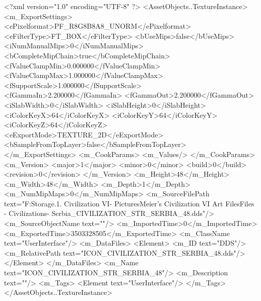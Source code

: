 <?xml version="1.0" encoding="UTF-8" ?>
<AssetObjects..TextureInstance>
	<m_ExportSettings>
		<ePixelformat>PF_R8G8B8A8_UNORM</ePixelformat>
		<eFilterType>FT_BOX</eFilterType>
		<bUseMips>false</bUseMips>
		<iNumManualMips>0</iNumManualMips>
		<bCompleteMipChain>true</bCompleteMipChain>
		<fValueClampMin>0.000000</fValueClampMin>
		<fValueClampMax>1.000000</fValueClampMax>
		<fSupportScale>1.000000</fSupportScale>
		<fGammaIn>2.200000</fGammaIn>
		<fGammaOut>2.200000</fGammaOut>
		<iSlabWidth>0</iSlabWidth>
		<iSlabHeight>0</iSlabHeight>
		<iColorKeyX>64</iColorKeyX>
		<iColorKeyY>64</iColorKeyY>
		<iColorKeyZ>64</iColorKeyZ>
		<eExportMode>TEXTURE_2D</eExportMode>
		<bSampleFromTopLayer>false</bSampleFromTopLayer>
	</m_ExportSettings>
	<m_CookParams>
		<m_Values/>
	</m_CookParams>
	<m_Version>
		<major>1</major>
		<minor>0</minor>
		<build>0</build>
		<revision>0</revision>
	</m_Version>
	<m_Height>48</m_Height>
	<m_Width>48</m_Width>
	<m_Depth>1</m_Depth>
	<m_NumMipMaps>0</m_NumMipMaps>
	<m_SourceFilePath text="F:\Mod Storage\2.1. Civilization VI\Mods\Archive - Pictures\Sid Meier's Civilization VI Art Files\Art Files - Civilizations\Civilization - Serbia\ICON_CIVILIZATION_STR_SERBIA_48.dds"/>
	<m_SourceObjectName text=""/>
	<m_ImportedTime>0</m_ImportedTime>
	<m_ExportedTime>3503328505</m_ExportedTime>
	<m_ClassName text="UserInterface"/>
	<m_DataFiles>
		<Element>
			<m_ID text="DDS"/>
			<m_RelativePath text="ICON_CIVILIZATION_STR_SERBIA_48.dds"/>
		</Element>
	</m_DataFiles>
	<m_Name text="ICON_CIVILIZATION_STR_SERBIA_48"/>
	<m_Description text=""/>
	<m_Tags>
		<Element text="UserInterface"/>
	</m_Tags>
</AssetObjects..TextureInstance>

